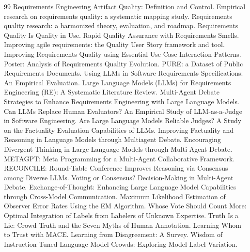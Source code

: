 \documentclass[a4paper,11pt]{ctexart}
\begin{document}
\begin{thebibliography}{99}
 Requirements Engineering Artifact Quality: Definition and Control.
 Empirical research on requirements quality: a systematic mapping study.
 Requirements quality research: a harmonized theory, evaluation, and roadmap.
 Requirements Quality Is Quality in Use.
 Rapid Quality Assurance with Requirements Smells.
 Improving agile requirements: the Quality User Story framework and tool.
 Improving Requirements Quality using Essential Use Case Interaction Patterns.
 Poster: Analysis of Requirements Quality Evolution.
 PURE: a Dataset of Public Requirements Documents.
 Using LLMs in Software Requirements Specifications: An Empirical Evaluation.
 Large Language Models (LLMs) for Requirements Engineering (RE): A Systematic Literature Review.
 Multi-Agent Debate Strategies to Enhance Requirements Engineering with Large Language Models.
 Can LLMs Replace Human Evaluators? An Empirical Study of LLM-as-a-Judge in Software Engineering.
 Are Large Language Models Reliable Judges? A Study on the Factuality Evaluation Capabilities of LLMs.
 Improving Factuality and Reasoning in Language Models through Multiagent Debate.
 Encouraging Divergent Thinking in Large Language Models through Multi-Agent Debate.
 METAGPT: Meta Programming for a Multi-Agent Collaborative Framework.
 RECONCILE: Round-Table Conference Improves Reasoning via Consensus among Diverse LLMs.
 Voting or Consensus? Decision-Making in Multi-Agent Debate.
 Exchange-of-Thought: Enhancing Large Language Model Capabilities through Cross-Model Communication.
 Maximum Likelihood Estimation of Observer Error Rates Using the EM Algorithm.
 Whose Vote Should Count More: Optimal Integration of Labels from Labelers of Unknown Expertise.
 Truth Is a Lie: Crowd Truth and the Seven Myths of Human Annotation.
 Learning Whom to Trust with MACE.
 Learning from Disagreement: A Survey.
 Wisdom of Instruction-Tuned Language Model Crowds: Exploring Model Label Variation.
\end{thebibliography}
\end{document}
